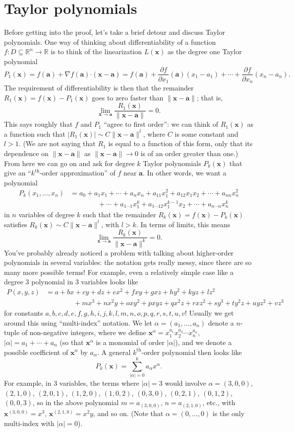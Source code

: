 \documentclass[12pt,letterpaper]{article}
\newcommand{\R}{\mathbb{R}}
\newcommand{\x}{\mathbf{x}}
\renewcommand{\a}{\mathbf{a}}
\newcommand{\pd}[2]{\frac{\partial #1}{\partial #2}}
\newcommand{\dotp}{\boldsymbol{\cdot}}
\newcommand{\len}[1]{\lVert #1\rVert}
\newcommand{\abs}[1]{\lvert #1\rvert}
\begin{document}
\section{Taylor polynomials}
Before getting into the proof, let's take a brief detour and discuss Taylor polynomials. One way of thinking about differentiability of a function $f:D\subseteq\R^n\to\R$ is to think of the linearization $L(\x)$ as the degree one Taylor polynomial
\[
 P_1(\x) = f(\a)+\nabla f(\a)\dotp(\x-\a) = f(\a)+ \pd{f}{x_1}(\a)(x_1-a_1)+\cdots + \pd{f}{x_n}(x_n-a_n).
\]
The requirement of differentiability is then that the remainder $R_1(\x) = f(\x)-P_1(\x)$ goes to zero faster than $\len{\x-\a}$; that is,
\[
 \lim_{\x\to\a}\frac{R_1(\x)}{\len{\x-\a}}=0.
\]
This says roughly that $f$ and $P_1$ ``agree to first order'': we can think of $R_1(\x)$ as a function such that $\abs{R_1(\x)}\sim C\len{\x-\a}^l$, where $C$ is some constant and $l>1$. (We are not saying that $R_1$ is equal to a function of this form, only that its dependence on $\len{\x-\a}$ as $\len{\x-\a}\to 0$ is of an order greater than one.) From here we can go on and ask for degree $k$ Taylor polynomials $P_k(\x)$ that give an ``$k^{\textrm{th}}$-order approximation'' of $f$ near $\a$. In other words, we want a polynomial
\begin{align*}
 P_k(x_1,\ldots, x_n) &= a_0 +a_{1}x_1+\cdots+a_{n}x_n+a_{11}x_1^2+a_{12}x_1x_2+\cdots+a_{nn}x_n^2\\
&\quad\quad\quad\quad +\cdots+a_{1\cdots 1}x_1^k+a_{1\cdots 12}x_1^{k-1}x_2+\cdots+a_{n\cdots n}x_n^k
\end{align*}
in $n$ variables of degree $k$ such that the remainder $R_k(\x) = f(\x)-P_k(\x)$ satisfies $R_k(\x)\sim C\len{\x-\a}^l$, with $l>k$. In terms of limits, this means
\[
 \lim_{\x\to\a}\frac{R_k(\x)}{\len{\x-\a}^k}=0.
\]
You've probably already noticed a problem with talking about higher-order polynomials in several variables: the notation gets really messy, since there are so many more possible terms! For example, even a relatively simple case like a degree 3 polynomial in 3 variables looks like
\begin{align*}
 P(x,y,z) &= a+bx+cy+dz+ex^2+fxy+gxz+hy^2+kyz+lz^2\\
&\quad\quad\quad\quad +mx^3+nx^2y+oxy^2+pxyz+qx^2z+rxz^2+sy^3+ty^2z+uyz^2+vz^3
\end{align*}
for constants $a,b,c,d,e,f,g,h,i,j,k,l,m,n,o,p,q,r,s,t,u,v$! Usually we get around this using ``multi-index'' notation. We let $\alpha=(a_1,\ldots, a_n)$ denote a $n$-tuple of non-negative integers, where we define $\x^\alpha = x_1^{a_1}x_2^{a_2}\cdots x_n^{a_n}$, $\abs{\alpha}=a_1+\cdots +a_n$ (so that $\x^\alpha$ is a monomial of order $\abs{\alpha}$),  and we denote a possible coefficient of $\x^\alpha$ by $a_\alpha$. A general $k^{\textrm{th}}$-order polynomial then looks like
\[
 P_k(\x) = \sum_{\abs{\alpha}=0}^k a_\alpha x^\alpha.
\]
For example, in 3 variables, the terms where $\abs{\alpha}=3$ would involve $\alpha = (3,0,0)$, $(2,1,0)$, $(2,0,1)$, $(1,2,0)$, $(1,0,2)$, $(0,3,0)$, $(0,2,1)$, $(0,1,2)$, $(0,0,3)$, so in the above polynomial $m=a_{(3,0,0)},\, n = a_{(2,1,0)}$, etc., with $\x^{(3,0,0)} = x^3,\, \x^{(2,1,0)} = x^2y$, and so on. (Note that $\alpha = (0,\ldots, 0)$ is the only multi-index with $\abs{\alpha}=0$). 
\end{document}
